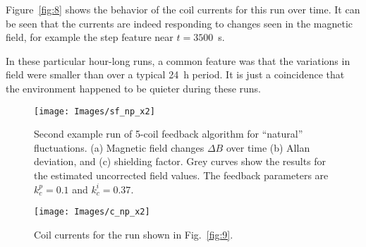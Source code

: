 Figure~\ref{fig:8} shows the behavior of the coil currents for this
run over time.  It can be seen that the currents are indeed responding
to changes seen in the magnetic field, for example the step feature
near $t=3500$~s.


In these particular hour-long runs, a common feature was that the variations in field were smaller than over a typical 24~h period. It is just a coincidence that the environment happened to be quieter during these runs.

\begin{figure}
\centering
        \texttt{[image: Images/sf\_np\_x2]}
        \caption[Second example run of 5-coil feedback algorithm for ``natural'' fluctuations]{Second example run of 5-coil feedback algorithm for ``natural'' fluctuations.  (a) Magnetic field changes $\Delta B$ over time (b) Allan deviation, and (c) shielding factor.  Grey curves show the results for the estimated uncorrected field values.  The feedback parameters are $k_c^p=0.1$ and $k_c^i=0.37$.}
        \label{fig:9}
        \texttt{[image: Images/c\_np\_x2]}
        \caption{Coil currents for the run shown in Fig.~\ref{fig:9}.}
        \label{fig:10}
\end{figure}




